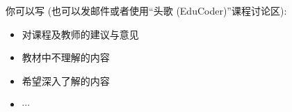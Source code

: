 \documentclass[a4paper, justified]{tufte-handout}
\begin{document}
\begin{solution}
\end{solution}



\begincorrection

\beginfb

你可以写 (也可以发邮件或者使用``头歌 (EduCoder)''课程讨论区):
\begin{itemize}
  \item 对课程及教师的建议与意见
  \item 教材中不理解的内容
  \item 希望深入了解的内容
  \item $\cdots$
\end{itemize}
\end{document}
